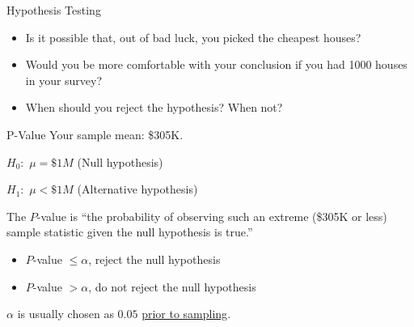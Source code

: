 \documentclass{beamer}\usepackage[]{graphicx}\usepackage[]{color}
\begin{document}
\begin{darkframes}
\begin{frame}[label=lists]{Hypothesis Testing}
\begin{itemize}
   \item Is it possible that, out of bad luck, you picked the cheapest houses? \pause
    
   \item Would you be more comfortable with your conclusion if you had 1000 houses in your survey? \pause
    
   \item When should you reject the hypothesis? When not?
    
   \end{itemize}


	\end{frame}
	
	
	\begin{frame}[label=lists]{P-Value}
		Your sample mean: \$305K. 	\newline \pause
	
		$H_0:$ $\mu=\$1M$	(Null hypothesis)
		
		$H_1:$ $\mu<\$1M$	(Alternative hypothesis) \newline \pause
		
		
		
		The \alert{$P$-value} is ``the probability of observing such an extreme (\$305K or less) sample statistic given the null hypothesis is true.'' \newline \pause
		
		\begin{itemize}
		\item $P$-value  $\leq \alpha$, reject the null hypothesis \pause
		\item $P$-value  $> \alpha$, do not reject the null hypothesis \pause
		
		\end{itemize}		
		
		
		$\alpha$ is usually chosen as $0.05$ \underline{prior to sampling}.		
		

	\end{frame}
	

\end{darkframes}
\end{document}
